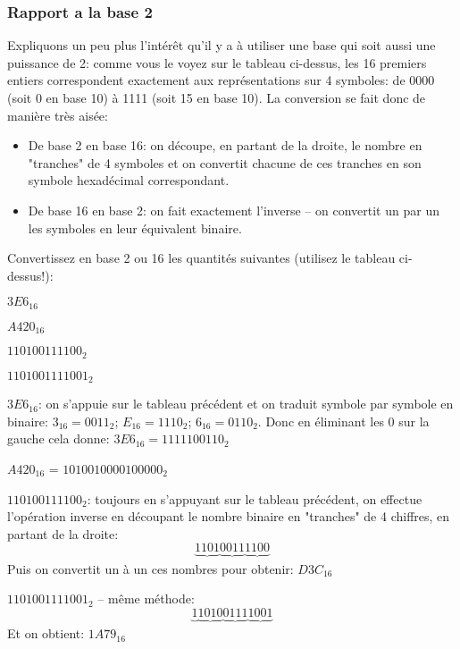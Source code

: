 \documentclass[12pt]{article}
\begin{document}
	 \subsubsection*{Rapport a la base 2}
	 Expliquons un peu plus l'intérêt qu'il y a à utiliser une base qui soit aussi une puissance de 2: comme vous le voyez sur le tableau ci-dessus, les 16 premiers entiers correspondent exactement aux représentations sur 4 symboles: de 0000 (soit 0 en base 10) à 1111 (soit 15 en base 10). La conversion se fait donc de manière très aisée:
	 \begin{itemize}
	 	\item De base 2 en base 16: on découpe, en partant de la droite, le nombre en "tranches" de 4 symboles et on convertit chacune de ces tranches en son symbole hexadécimal correspondant.
	 	\item De base 16 en base 2: on fait exactement l'inverse -- on convertit un par un les symboles en leur équivalent binaire.
	 \end{itemize}
	 \begin{MonExo}
	 	Convertissez en base 2 ou 16 les quantités suivantes (utilisez le tableau ci-dessus!):
	 	\begin{alphenum}
	 		\item $3E6_{16}$
	 		\item $A420_{16}$
	 		\item $110100111100_2$
	 		\item $1101001111001_2$
	 	\end{alphenum}
	 \end{MonExo}
	 \begin{MaReponse}
		\begin{alphenum}
			\item $3E6_{16}$: on s'appuie sur le tableau précédent et on traduit symbole par symbole en binaire: $3_{16} = 0011_2$;  $E_{16} = 1110_2$; $6_{16} = 0110_2$. Donc en éliminant les 0 sur la gauche cela donne: $3E6_{16} = 1111100110_2$
			\item $A420_{16}$ = $101	0010000100000_2$
			\item $110100111100_2$: toujours en s'appuyant sur le tableau précédent, on effectue l'opération inverse en découpant le nombre binaire en "tranches" de 4 chiffres, en partant de la droite:
			\[ \underbrace{1101}_{}\underbrace{0011}_{}\underbrace{1100}_{}\]
			Puis on convertit un à un ces nombres pour obtenir: $D3C_{16}$
			
			\item $1101001111001_2$ -- même méthode:
			\[ \underbrace{1}_{}\underbrace{1010}_{}\underbrace{0111}_{}\underbrace{1001}_{}\]
			Et on obtient: $1A79_{16}$
		\end{alphenum}
	\end{MaReponse}
	 
\end{document}
